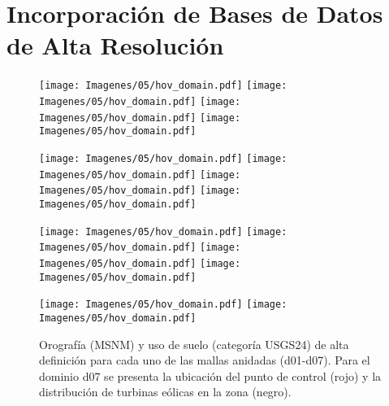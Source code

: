 \chapter{Incorporación de Bases de Datos de Alta Resolución}
\newpage
\begin{figure}[H]
	\centering
	\texttt{[image: Imagenes/05/hov\_domain.pdf]}%
	\texttt{[image: Imagenes/05/hov\_domain.pdf]}%
	\texttt{[image: Imagenes/05/hov\_domain.pdf]}%
	\texttt{[image: Imagenes/05/hov\_domain.pdf]}%
	
	\bigskip
	\texttt{[image: Imagenes/05/hov\_domain.pdf]}%
	\texttt{[image: Imagenes/05/hov\_domain.pdf]}%
	\texttt{[image: Imagenes/05/hov\_domain.pdf]}%
	\texttt{[image: Imagenes/05/hov\_domain.pdf]}%
	
	\bigskip
	\texttt{[image: Imagenes/05/hov\_domain.pdf]}%
	\texttt{[image: Imagenes/05/hov\_domain.pdf]}%
	\texttt{[image: Imagenes/05/hov\_domain.pdf]}%
	\texttt{[image: Imagenes/05/hov\_domain.pdf]}%
	
	\bigskip
	\texttt{[image: Imagenes/05/hov\_domain.pdf]}%
	\texttt{[image: Imagenes/05/hov\_domain.pdf]}%
	
	\caption{Orografía (MSNM) y uso de suelo (categoría USGS24) de alta definición para cada uno de las mallas anidadas (d01-d07). Para el dominio d07 se presenta la ubicación del punto de control (rojo) y la distribución de turbinas eólicas en la zona (negro).}
	\label{fig:dominios}
\end{figure}

